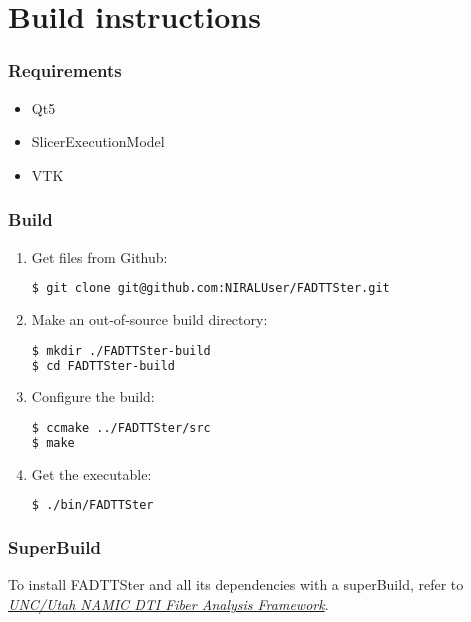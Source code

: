 \documentclass[fadttsterUserGuide_master]{subfiles}
\begin{document}
	\part{Build instructions}
	
	\section{Requirements}
	\begin{itemize}
		\item Qt5
		\item SlicerExecutionModel
		\item VTK
	\end{itemize}		
	
	\section{Build}
	\begin{enumerate}
		\item Get files from Github:
		\begin{lstlisting}[language=bash]
$ git clone git@github.com:NIRALUser/FADTTSter.git
		\end{lstlisting}
		\item Make an out-of-source build directory:
		\begin{lstlisting}[language=bash]
$ mkdir ./FADTTSter-build
$ cd FADTTSter-build
		\end{lstlisting}
		\item Configure the build:
		\begin{lstlisting}[language=bash]
$ ccmake ../FADTTSter/src
$ make
		\end{lstlisting}
		\item Get the executable:
		\begin{lstlisting}[language=bash]
$ ./bin/FADTTSter
		\end{lstlisting}
	\end{enumerate}
	
	\section{SuperBuild}
	To install FADTTSter and all its dependencies with a superBuild, refer to \href{https://www.nitrc.org/projects/namicdtifiber/}{\textit{UNC/Utah NAMIC DTI Fiber Analysis Framework}}.
	\vfill
\end{document}
